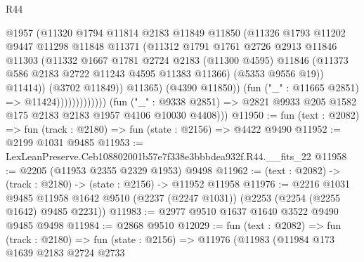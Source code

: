 \begin{lexlean}{R44}
\begin{coremodule}
                                    @1957
                                    (@11320
                                      @1794
                                      @11814
                                      @2183
                                      @11849
                                      @11850
                                      (@11326
                                        @1793
                                        @11202
                                        @9447
                                        @11298
                                        @11848
                                        @11371
                                        (@11312
                                          @1791
                                          @1761
                                          @2726
                                          @2913
                                          @11846
                                          @11303
                                          (@11332
                                            @1667
                                            @1781
                                            @2724
                                            @2183
                                            (@11300 @4595)
                                            @11846
                                            (@11373 @586 @2183 @2722 @11243 @4595 @11383 @11366)
                                            (@5353 @9556 @19))
                                          @11414))
                                      (@3702 @11849))
                                    @11365)
                                  (@4390 @11850))
                                (fun ("_" : @11665 @2851) => @11424)))))))))))))
        (fun ("_" : @9338 @2851) =>
        @2821 @9933 @205 @1582 @175 @2183 @2183 @1957 @4106 @10030 @4408)))
@11950 := fun (text : @2082) => fun (track : @2180) => fun (state : @2156) => @4422 @9490
@11952 := @2199 @1031 @9485
@11953 := LexLeanPreserve.Ceb108802001b57e7f338e3bbbdea932f.R44.__fits_22
@11958 := @2205 (@11953 @2355 @2329 @1953) @9498
@11962 := (text : @2082) -> (track : @2180) -> (state : @2156) -> @11952 @11958
@11976 := @2216
    @1031
    @9485
    @11958
    @1642
    @9510
    (@2237 (@2247 @1031))
    (@2253 (@2254 (@2255 @1642) @9485 @2231))
@11983 := @2977 @9510 @1637 @1640 @3522 @9490 @9485 @9498
@11984 := @2868 @9510
@12029 := fun (text : @2082) =>
  fun (track : @2180) =>
  fun (state : @2156) =>
  @11976
    (@11983
      (@11984
        @173
        @1639
        @2183
        @2724
        @2733

\end{coremodule}
\end{lexlean}
